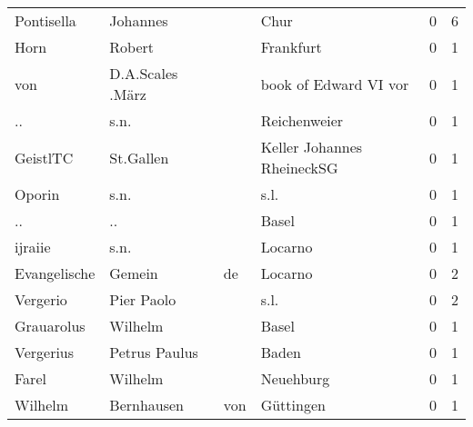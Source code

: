 \begin{center}
\begin{tiny}
\begin{longtabu}{llllrr}
               Pontisella &                           Johannes &             &                                        Chur &          0 &         6 \\
                     Horn &                             Robert &             &                                   Frankfurt &          0 &         1 \\
                      von &                   D.A.Scales .März &             &                       book of Edward VI vor &          0 &         1 \\
                       .. &                               s.n. &             &                                Reichenweier &          0 &         1 \\
                 GeistlTC &                          St.Gallen &             &                  Keller Johannes RheineckSG &          0 &         1 \\
                   Oporin &                               s.n. &             &                                        s.l. &          0 &         1 \\
                       .. &                                 .. &             &                                       Basel &          0 &         1 \\
                  ijraiie &                               s.n. &             &                                     Locarno &          0 &         1 \\
             Evangelische &                             Gemein &          de &                                     Locarno &          0 &         2 \\
                 Vergerio &                         Pier Paolo &             &                                        s.l. &          0 &         2 \\
               Grauarolus &                            Wilhelm &             &                                       Basel &          0 &         1 \\
                Vergerius &                      Petrus Paulus &             &                                       Baden &          0 &         1 \\
                    Farel &                            Wilhelm &             &                                   Neuehburg &          0 &         1 \\
                  Wilhelm &                         Bernhausen &         von &                                   Güttingen &          0 &         1 \\

\end{longtabu}
\end{tiny}
\end{center}
